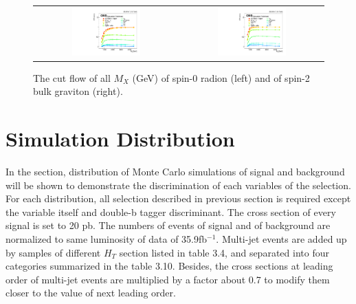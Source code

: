 \begin{figure}[t]
  \centering
  \begin{tabular}{cc}
    \includegraphics[width=0.5\textwidth]{Figures/fig_eff_rd.pdf} &
    \includegraphics[width=0.5\textwidth]{Figures/fig_eff_bg.pdf} \\
    
  \end{tabular}
  \caption{The cut flow of all $M_X$ (GeV) of spin-0 radion (left) and of spin-2 bulk graviton (right).}
  \label{fig:hvt_brs}
\end{figure}

\section{Simulation Distribution} 
In the section, distribution of Monte Carlo simulations of signal and background will be shown to demonstrate the discrimination of each variables of the selection. For each distribution, all selection described in previous section is required except the variable itself and double-b tagger discriminant. The cross section of every signal is set to 20 pb. The numbers of events of signal and of background are normalized to same luminosity of data of 35.9fb$^{-1}$. Multi-jet events are added up by samples of different $H_T$ section listed in table 3.4, and separated into four categories summarized in the table 3.10.  Besides, the cross sections at leading order of multi-jet events are multiplied by a factor about 0.7 to modify them closer to the value of next leading order.


